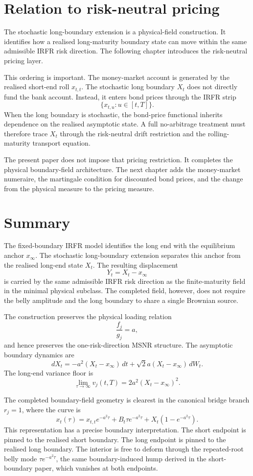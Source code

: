 \documentclass[11pt]{article}
\begin{document}
\section{Relation to risk-neutral pricing}

The stochastic long-boundary extension is a physical-field construction. It identifies how a realised long-maturity boundary state can move within the same admissible IRFR risk direction. The following chapter introduces the risk-neutral pricing layer.

This ordering is important. The money-market account is generated by the realised short-end roll \(x_{t,t}\). The stochastic long boundary \(X_t\) does not directly fund the bank account. Instead, it enters bond prices through the IRFR strip
\[
\{x_{t,u}:u\in[t,T]\}.
\]
When the long boundary is stochastic, the bond-price functional inherits dependence on the realised asymptotic state. A full no-arbitrage treatment must therefore trace \(X_t\) through the risk-neutral drift restriction and the rolling-maturity transport equation.

The present paper does not impose that pricing restriction. It completes the physical boundary-field architecture. The next chapter adds the money-market numeraire, the martingale condition for discounted bond prices, and the change from the physical measure to the pricing measure.


\section{Summary}

The fixed-boundary IRFR model identifies the long end with the equilibrium anchor \(x_\infty\). The stochastic long-boundary extension separates this anchor from the realised long-end state \(X_t\). The resulting displacement
\[
Y_t=X_t-x_\infty
\]
is carried by the same admissible IRFR risk direction as the finite-maturity field in the minimal physical subclass. The completed field, however, does not require the belly amplitude and the long boundary to share a single Brownian source.

The construction preserves the physical loading relation
\[
\frac{f_j}{g_j}=a,
\]
and hence preserves the one-risk-direction MSNR structure. The asymptotic boundary dynamics are
\[
dX_t
=
-a^2(X_t-x_\infty)\,dt
+
\sqrt{2}a(X_t-x_\infty)\,dW_t.
\]
The long-end variance floor is
\[
\lim_{\tau\to\infty}v_j(t,T)
=
2a^2(X_t-x_\infty)^2.
\]

The completed boundary-field geometry is clearest in the canonical bridge branch \(r_j=1\), where the curve is
\[
x_t(\tau)
=
x_{t,t}e^{-a^2\tau}
+
B_t\tau e^{-a^2\tau}
+
X_t\left(1-e^{-a^2\tau}\right).
\]
This representation has a precise boundary interpretation. The short endpoint is pinned to the realised short boundary. The long endpoint is pinned to the realised long boundary. The interior is free to deform through the repeated-root belly mode \(\tau e^{-a^2\tau}\), the same boundary-induced hump derived in the short-boundary paper, which vanishes at both endpoints.
\end{document}
